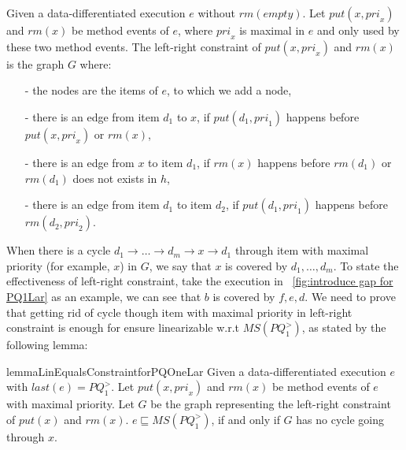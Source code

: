 \begin{definition}\label{def:left-right constraint for matched put and rm operations}
Given a data-differentiated execution $e$ without $\textit{rm}(\textit{empty})$. Let $\textit{put}(x,\textit{pri}_x)$ and $\textit{rm}(x)$ be method events of $e$, where $\textit{pri}_x$ is maximal in $e$ and only used by these two method events. The left-right constraint of $\textit{put}(x,\textit{pri}_x)$ and $\textit{rm}(x)$ is the graph $G$ where:

\begin{itemize}
\setlength{\itemsep}{0.5pt}
\item[-] the nodes are the items of $e$, to which we add a node,

\item[-] there is an edge from item $d_1$ to $x$, if $\textit{put}(d_1,\textit{pri}_1)$ happens before $\textit{put}(x,\textit{pri}_x)$ or $\textit{rm}(x)$,

\item[-] there is an edge from $x$ to item $d_1$, if $\textit{rm}(x)$ happens before $\textit{rm}(d_1)$ or $\textit{rm}(d_1)$ does not exists in $h$,

\item[-] there is an edge from item $d_1$ to item $d_2$, if $\textit{put}(d_1,\textit{pri}_1)$ happens before $\textit{rm}(d_2,\textit{pri}_2)$.
\end{itemize}
\end{definition}

When there is a cycle $d_1 \rightarrow \ldots \rightarrow d_m \rightarrow x \rightarrow d_1$ through item with maximal priority (for example, $x$) in $G$, we say that $x$ is covered by $d_1,\ldots,d_m$. To state the effectiveness of left-right constraint, take the execution in \figurename~\ref{fig:introduce gap for PQ1Lar} as an example, we can see that $b$ is covered by $f,e,d$. We need to prove that getting rid of cycle though item with maximal priority in left-right constraint is enough for ensure linearizable w.r.t $\textit{MS}(\textit{PQ}_1^{>})$, as stated by the following lemma:

\begin{restatable}{lemma}{LinEqualsConstraintforPQOneLar}
\label{lemma:Lin Equals Constraint for PQ1Lar}
Given a data-differentiated execution $e$ with $\textit{last}(e) = \textit{PQ}_1^{>}$. Let $\textit{put}(x,\textit{pri}_x)$ and $\textit{rm}(x)$ be method events of $e$ with maximal priority. Let $G$ be the graph representing the left-right constraint of $\textit{put}(x)$ and $\textit{rm}(x)$. $e \sqsubseteq \textit{MS}(\textit{PQ}_1^{>})$, if and only if $G$ has no cycle going through $x$.
\end{restatable}

